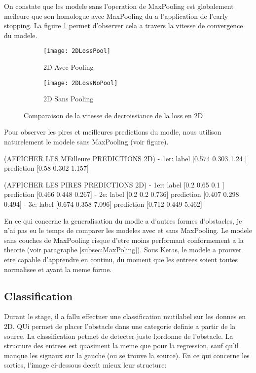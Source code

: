     On constate que les modele sans l'operation de MaxPooling est globalement meileure que son homologue avec MaxPooling du a l'application de l'early stopping. La figure \ref{fig:2DLoss} permet d'observer cela a travers la vitesse de convergence du modele.
    
    \begin{figure}[!h]
    \begin{subfigure}{.5\textwidth}
    \centering
    \texttt{[image: 2DLossPool]}  
    \caption[2DPool]{2D Avec Pooling}
    \end{subfigure}
    \begin{subfigure}{.5\textwidth}
    \centering
    \texttt{[image: 2DLossNoPool]}  
    \caption[2DNoPool]{2D Sans Pooling}
    \end{subfigure}
    \label{fig:2DLoss}

    \centering
    \decoRule
    \caption[Loss en 2D]{Comparaison de la vitesse de decroissiance de la loss en 2D}
    \end{figure}

    Pour observer les pires et meilleures predictions du modle, nous utilison naturelement le modele sans MaxPooling (voir figure).
    
    (AFFICHER LES MEilleure PREDICTIONS 2D)
    - 1er: label [0.574 0.303 1.24 ]     prediction [0.58  0.302 1.157]
    
    (AFFICHER LES PIRES PREDICTIONS 2D)
    - 1er: label [0.2  0.65 0.1 ]     prediction [0.466 0.448 0.267]
    - 2e: label [0.2   0.2   0.736]     prediction [0.407 0.298 0.494]
    - 3e: label [0.674 0.358 7.096]     prediction [0.712 0.449 5.462]
    
    
    En ce qui concerne la generalisation du modle a d'autres formes d'obstacles, je n'ai pas eu le temps de comparer les modeles avec et sans MaxPooling. Le modele sans couches de MaxPooling risque d'etre moins performant conformement a la theorie (voir paragraphe \ref{subsec:MaxPoling}). Sous Keras, le modele a prouver etre capable d'apprendre en continu, du moment que les entrees soient toutes normalisee et ayant la meme forme.

\subsection{Classification}
Durant le stage, il a fallu effectuer une classification mutilabel sur les donnes en 2D. QUi permet de placer l'obstacle dans une categorie definie a partir de la source. La classification petmet de detecter juste l;ordonne de l'obstacle. La structure des entrees est quasiment la meme que pour la regression, sauf qu'il manque les signaux sur la gauche (ou se trouve la source). En ce qui concerne les sorties, l'image ci-dessous decrit mieux leur structure:

